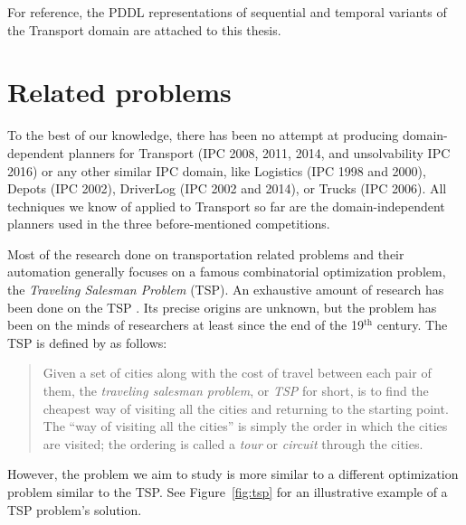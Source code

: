 For reference, the PDDL representations of sequential and temporal variants of
the Transport domain are attached to this thesis.


















\section{Related problems}

To the best of our knowledge, there has been no attempt at producing domain-dependent planners
for Transport (IPC 2008, 2011, 2014, and unsolvability IPC 2016) or any other similar IPC domain, like Logistics (IPC 1998 and 2000),
Depots (IPC 2002),
DriverLog (IPC 2002 and 2014),
or Trucks (IPC 2006).
All techniques we know of applied to Transport so far are the
domain-independent planners used in the three before-mentioned competitions.

Most of the research done on transportation related problems and their automation
generally focuses
on a famous combinatorial optimization problem, the \textit{Traveling Salesman Problem} (TSP). An
exhaustive amount of research has been done on the TSP \citep{Applegate1998, Applegate2011}. Its precise origins are unknown, but the problem has been on the minds of researchers at least since the end of the 19$^\textrm{th}$ century. The TSP is defined by \citet{Applegate2011} as follows:
\begin{quote}
Given a set of cities along with the cost of travel between each pair of them, the \textit{traveling salesman problem}, or \textit{TSP} for short, is to find the cheapest way of visiting all the cities and returning to the starting point. The ``way of visiting all the cities'' is simply the order in which the cities are visited; the ordering is called a \textit{tour} or \textit{circuit} through the cities.
\end{quote}
However, the problem we aim to study is more similar to a different optimization problem similar to the TSP. See Figure~\ref{fig:tsp} for an illustrative example of a TSP problem's solution.

